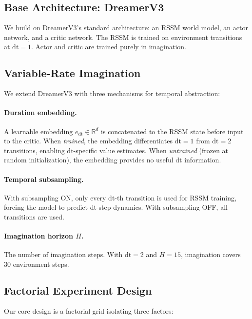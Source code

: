 \documentclass[10pt,letterpaper]{article}
\begin{document}
\subsection{Base Architecture: DreamerV3}

We build on DreamerV3's standard architecture: an RSSM world model, an actor network, and a critic network. The RSSM is trained on environment transitions at $\mathrm{dt}{=}1$. Actor and critic are trained purely in imagination.

\subsection{Variable-Rate Imagination}

We extend DreamerV3 with three mechanisms for temporal abstraction:

\paragraph{Duration embedding.} A learnable embedding $e_{\mathrm{dt}} \in \mathbb{R}^{d}$ is concatenated to the RSSM state before input to the critic. When \emph{trained}, the embedding differentiates $\mathrm{dt}{=}1$ from $\mathrm{dt}{=}2$ transitions, enabling $\mathrm{dt}$-specific value estimates. When \emph{untrained} (frozen at random initialization), the embedding provides no useful $\mathrm{dt}$ information.

\paragraph{Temporal subsampling.} With subsampling ON, only every $\mathrm{dt}$-th transition is used for RSSM training, forcing the model to predict $\mathrm{dt}$-step dynamics. With subsampling OFF, all transitions are used.

\paragraph{Imagination horizon $H$.} The number of imagination steps. With $\mathrm{dt}{=}2$ and $H{=}15$, imagination covers 30 environment steps.

\subsection{Factorial Experiment Design}

Our core design is a factorial grid isolating three factors:
\end{document}

